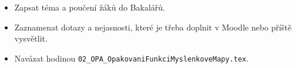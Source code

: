 \documentclass[11pt,a4paper]{article}
\begin{document}

\begin{itemize}[label=$\square$]
  \item Zapsat téma a poučení žáků do Bakalářů.
  \item Zaznamenat dotazy a nejasnosti, které je třeba doplnit v Moodle nebo příště vysvětlit.
  \item Navázat hodinou \texttt{02\_OPA\_OpakovaniFunkciMyslenkoveMapy.tex}.
\end{itemize}
\end{document}
